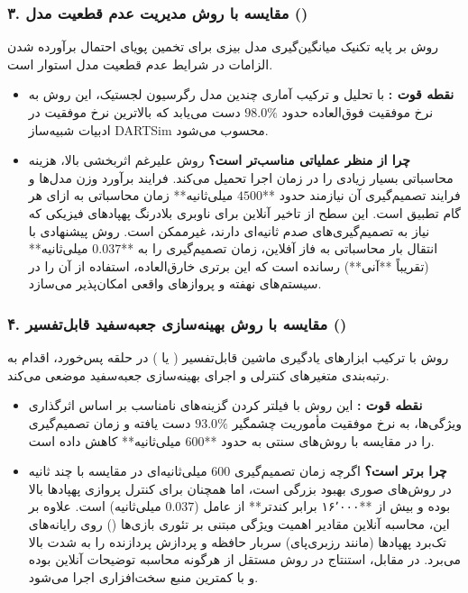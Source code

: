 \documentclass[oneside,openany,a4paper,12pt,draft]{article}
\begin{document}
\subsubsection{۳. مقایسه با روش مدیریت عدم قطعیت مدل  ()}
روش  بر پایه تکنیک میانگین‌گیری مدل بیزی  برای تخمین پویای احتمال برآورده شدن الزامات در شرایط عدم قطعیت مدل استوار است.
\begin{itemize}
    \item \textbf{نقطه قوت :} با تحلیل و ترکیب آماری چندین مدل رگرسیون لجستیک، این روش به نرخ موفقیت فوق‌العاده حدود $98.0\%$ دست می‌یابد که بالاترین نرخ موفقیت در ادبیات شبیه‌ساز DARTSim محسوب می‌شود.
    \item \textbf{چرا  از منظر عملیاتی مناسب‌تر است؟} روش  علیرغم اثربخشی بالا، هزینه محاسباتی بسیار زیادی را در زمان اجرا تحمیل می‌کند. فرایند برآورد وزن مدل‌ها و فرایند تصمیم‌گیری آن نیازمند حدود **$4500$ میلی‌ثانیه** زمان محاسباتی به ازای هر گام تطبیق است. این سطح از تاخیر آنلاین برای ناوبری بلادرنگ پهپادهای فیزیکی که نیاز به تصمیم‌گیری‌های صدم ثانیه‌ای دارند، غیرممکن است. روش پیشنهادی  با انتقال بار محاسباتی به فاز آفلاین، زمان تصمیم‌گیری را به **$0.037$ میلی‌ثانیه** (تقریباً **آنی**) رسانده است که این برتری خارق‌العاده، استفاده از آن را در سیستم‌های نهفته و پروازهای واقعی امکان‌پذیر می‌سازد.
\end{itemize}

\subsubsection{۴. مقایسه با روش بهینه‌سازی جعبه‌سفید قابل‌تفسیر  ()}
روش  با ترکیب ابزارهای یادگیری ماشین قابل‌تفسیر ( یا ) در حلقه پس‌خورد، اقدام به رتبه‌بندی متغیرهای کنترلی و اجرای بهینه‌سازی جعبه‌سفید موضعی می‌کند.
\begin{itemize}
    \item \textbf{نقطه قوت :} این روش با فیلتر کردن گزینه‌های نامناسب بر اساس اثرگذاری ویژگی‌ها، به نرخ موفقیت مأموریت چشمگیر $93.0\%$ دست یافته و زمان تصمیم‌گیری را در مقایسه با روش‌های سنتی به حدود **$600$ میلی‌ثانیه** کاهش داده است.
    \item \textbf{چرا  برتر است؟} اگرچه زمان تصمیم‌گیری $600$ میلی‌ثانیه‌ای در مقایسه با چند ثانیه در روش‌های صوری بهبود بزرگی است، اما همچنان برای کنترل پروازی پهپادها بالا بوده و بیش از **۱۶٬۰۰۰ برابر کندتر** از عامل  ($0.037$ میلی‌ثانیه) است. علاوه بر این، محاسبه آنلاین مقادیر اهمیت ویژگی مبتنی بر تئوری بازی‌ها () روی رایانه‌های تک‌برد پهپادها (مانند رزبری‌پای) سربار حافظه و پردازش پردازنده را به شدت بالا می‌برد. در مقابل، استنتاج در روش  مستقل از هرگونه محاسبه توضیحات آنلاین بوده و با کمترین منبع سخت‌افزاری اجرا می‌شود.
\end{itemize}
\end{document}
